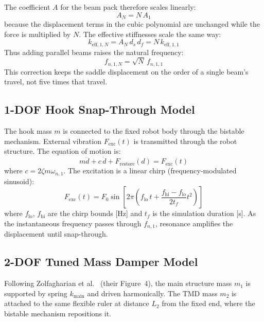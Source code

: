 \documentclass[11pt,letterpaper]{article}
\begin{document}
The coefficient $A$ for the beam pack therefore scales linearly:
\begin{equation}
  A_N = N\,A_1
  \label{eq:AN}
\end{equation}
because the displacement terms in the cubic polynomial are unchanged while the
force is multiplied by $N$. The effective stiffnesses scale the same way:
\begin{equation}
  k_{\mathrm{eff,1},N} = A_N\,d_s\,d_f = N\,k_{\mathrm{eff,1},1}
  \label{eq:keffN}
\end{equation}
Thus adding parallel beams raises the natural frequency:
\begin{equation}
  f_{n,1,N} = \sqrt{N}\,f_{n,1,1}
  \label{eq:fnN}
\end{equation}
This correction keeps the saddle displacement on the order of a single beam's
travel, not five times that travel.

\subsection{1-DOF Hook Snap-Through Model}
\label{ssec:1dof}

The hook mass $m$ is connected to the fixed robot body through the bistable
mechanism. External vibration $F_{\mathrm{exc}}(t)$ is transmitted through
the robot structure. The equation of motion is:
\begin{equation}
  m\ddot{d} + c\,\dot{d} + F_{\mathrm{restore}}(d) = F_{\mathrm{exc}}(t)
  \label{eq:1dof2}
\end{equation}
where $c = 2\zeta m\omega_{n,1}$. The excitation is a linear chirp
(frequency-modulated sinusoid):
\begin{equation}
  F_{\mathrm{exc}}(t) = F_0\sin\!\left[2\pi\!\left(f_{\mathrm{lo}}\,t
    + \frac{f_{\mathrm{hi}} - f_{\mathrm{lo}}}{2t_f}t^2\right)\right]
  \label{eq:chirp}
\end{equation}
where $f_{\mathrm{lo}}$, $f_{\mathrm{hi}}$ are the chirp bounds [Hz] and
$t_f$ is the simulation duration [s]. As the instantaneous frequency passes
through $f_{n,1}$, resonance amplifies the displacement until snap-through.

\subsection{2-DOF Tuned Mass Damper Model}
\label{ssec:2dof}

Following Zolfagharian et al.~\cite{zolfagharian2025} (their Figure~4), the
main structure mass $m_1$ is supported by spring $k_{\mathrm{main}}$ and
driven harmonically. The TMD mass $m_2$ is attached to the same flexible ruler
at distance $L_2$ from the fixed end, where the bistable mechanism
repositions it.
\end{document}
